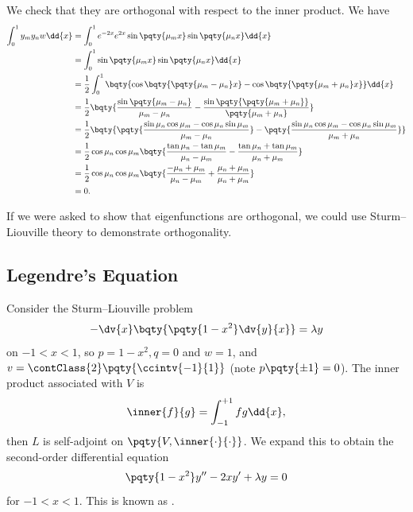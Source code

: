 \begin{example}
    We check that they are orthogonal with respect to the inner product. We have
    \begin{subequations}
        \begin{align}
            \int_0^1 y_m y_n w \dd{x} &= \int_0^1 e^{-2x} e^{2x} \sin \pqty{\mu_m x} \sin \pqty{\mu_n x} \dd{x} \\
            &= \int_0^1 \sin \pqty{\mu_m x} \sin \pqty{\mu_n x} \dd{x} \\
            &= \frac{1}{2} \int_0^1 \bqty{\cos \bqty{\pqty{\mu_m - \mu_n} x} - \cos \bqty{\pqty{\mu_m + \mu_n} x}} \dd{x} \\
            &= \frac{1}{2} \bqty{\frac{\sin \pqty{\mu_m - \mu_n}}{\mu_m - \mu_n} - \frac{\sin \pqty{\pqty{\mu_m + \mu_n}}}{\pqty{\mu_m + \mu_n}}} \\
            &= \frac{1}{2} \bqty{\pqty{\frac{\sin \mu_n \cos \mu_m - \cos \mu_n \sin \mu_m}{\mu_m - \mu_n}} - \pqty{\frac{\sin \mu_n \cos \mu_m - \cos \mu_n \sin \mu_m}{\mu_m + \mu_n}}} \\
            &= \frac{1}{2} \cos \mu_n \cos \mu_m \bqty{\frac{\tan \mu_n - \tan \mu_m}{\mu_n - \mu_m} - \frac{\tan \mu_n + \tan \mu_m}{\mu_n + \mu_m}} \\
            &= \frac{1}{2} \cos \mu_n \cos \mu_m \bqty{\frac{- \mu_n + \mu_m}{\mu_n - \mu_m} + \frac{\mu_n + \mu_m}{\mu_n + \mu_m}} \\
            &= 0.
        \end{align}
    \end{subequations}
\end{example}

\begin{remark}
    If we were asked to show that eigenfunctions are orthogonal, we could use Sturm--Liouville theory to demonstrate orthogonality.
\end{remark}

\subsection{Legendre's Equation}

Consider the Sturm--Liouville problem
\begin{equation}
    - \dv{x} \bqty{\pqty{1 - x^2} \dv{y}{x}} = \lambda  y
\end{equation}
on \(-1 < x < 1\), so \(p = 1 - x^2, q = 0\) and \(w = 1\), and \(v = \contClass{2} \pqty{\ccintv{-1}{1}}\) (note \(p\pqty{\pm 1} = 0\)). The inner product associated with \(V\) is
\begin{equation}
    \inner{f}{g} = \int_{-1}^{+1} fg \dd{x},
\end{equation}
then \(L\) is self-adjoint on \(\pqty{V, \inner{\cdot}{\cdot}}\). We expand this to obtain the second-order differential equation
\begin{equation}
    \pqty{1 - x^2} y'' - 2 x y' + \lambda y = 0
\end{equation}
for \(-1 < x < 1\). This is known as .

